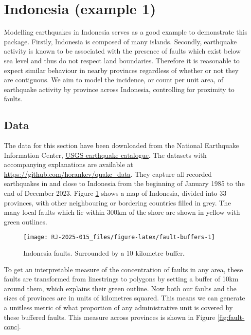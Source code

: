 \section{Indonesia (example 1)}\label{indonesia-example-1}

Modelling earthquakes in Indonesia serves as a good example to
demonstrate this package. Firstly, Indonesia is composed of many
islands. Secondly, earthquake activity is known to be associated with
the presence of faults which exist below sea level and thus do not
respect land boundaries. Therefore it is reasonable to expect similar
behaviour in nearby provinces regardless of whether or not they are
contiguous. We aim to model the incidence, or count per unit area, of earthquake activity by
province across Indonesia, controlling for proximity to faults.

\subsection{Data}\label{data}

The data for this section have been downloaded from the National Earthquake Information Center, \href{https://earthquake.usgs.gov/earthquakes/search/}{USGS earthquake
catalogue}. The
datasets with accompanying explanations are available at
\url{https://github.com/horankev/quake_data}. They capture all recorded earthquakes in
and close to Indonesia from the beginning of January 1985 to the end of December 2023. Figure \ref{fig:fault-buffers} shows a map of Indonesia, divided into 33 provinces, with other neighbouring or bordering countries filled in grey. The many local
faults which lie within 300km of the shore are shown in yellow with green outlines.

\begin{figure}

{\centering \texttt{[image: RJ-2025-015\_files/figure-latex/fault-buffers-1]} 

}

\caption{Indonesia faults. Surrounded by a 10 kilometre buffer. }\label{fig:fault-buffers}
\end{figure}

To get an interpretable measure of the concentration of faults in any area,
these faults are transformed from linestrings to polygons by setting a buffer of
10km around them, which explains their green outline. Now both our faults and the sizes of provinces are in units of kilometres
squared. This means we can generate a unitless metric of what proportion of any administrative unit
is covered by these buffered faults. This measure across provinces is shown in Figure
\ref{fig:fault-conc}.

